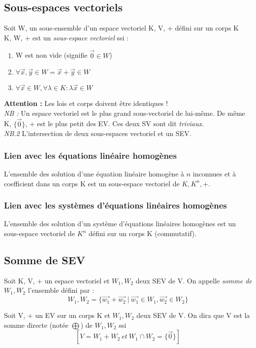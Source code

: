\documentclass[12pt, a4paper]{article}
\begin{document}
\subsection{Sous-espaces vectoriels}
Soit W, un sous-ensemble d'un espace vectoriel K, V, + défini sur un corps K\\
K, W, + est un \textit{sous-espace vectoriel} ssi :
\begin{enumerate}
\item W est non vide (signifie $\vec{0} \in W$)
\item $\forall \vec{x}, \vec{y} \in W = \vec{x} + \vec{y} \in W$
\item $\forall \vec{x} \in W, \forall \lambda \in K : \lambda\vec{x} \in W$
\end{enumerate}
\textbf{Attention :} Les lois et corps doivent être identiques !\\
\textit{NB :} Un espace vectoriel est le plus grand sous-vectoriel de lui-même. De même K, $\{\vec{0}\}$, + est le plus petit des EV. Ces deux SV sont dit \textit{triviaux}.\\
\textit{NB.2 } L'intersection de deux sous-espaces vectoriel et un SEV.

\subsubsection{Lien avec les équations linéaire homogènes}
L'ensemble des solution d'une équation linéaire homogène à $n$ inconnues et à coefficient dans un corps K est un sous-espace vectoriel de $K, K^{n}, +$.

\subsubsection{Lien avec les systèmes d'équations linéaires homogènes}
L'ensemble des solution d'un système d'équations linéaires homogènes est un sous-espace vectoriel de $K^{n}$ défini sur un corps K (commutatif).

\subsection{Somme de SEV}
Soit K, V, + un espace vectoriel et $W_{1}, W_{2}$ deux SEV de V. On appelle \textit{somme de $W_{1}, W_{2}$} l'ensemble défini par :
$$W_{1}, W_{2} = \{\vec{w_{1}} + \vec{w_{2}}\ |\ \vec{w_{1}} \in W_{1}, \vec{w_{2}} \in W_{2}\}$$

Soit V, + un  EV sur un corps K et $W_{1}, W_{2}$ deux SEV de V. On dira que V est la somme directe (notée $\bigoplus$) de $W_{1}, W_{2}$ ssi
$$[V = W_{1} + W_{2}\ et\ W_{1} \cap W_{2} = \{\vec{0}\}]$$
\end{document}
